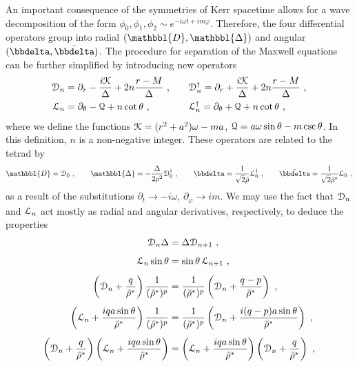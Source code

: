 An important consequence of the symmetries of Kerr spacetime allows for a wave decomposition of the form $\phi_0, \phi_1, \phi_2 \sim e^{- i \omega t + i m \varphi}$.
Therefore, the four differential operators group into radial $(\mathbbl{D}, \mathbbl{\Delta})$ and angular $(\bbdelta, \bar{\bbdelta})$. The procedure for separation of the Maxwell equations can be further simplified by introducing new operators
\begin{equation}
    \begin{alignedat}{3}
        \EuScript{D}_n &= \partial_r - \frac{i \EuScript{K}}{\Delta} + 2n \frac{r-M}{\Delta} ~,\qquad && \EuScript{D}_n^\dagger = \partial_r + \frac{i \EuScript{K}}{\Delta} + 2n \frac{r-M}{\Delta} ~,\\
        \EuScript{L}_n &= \partial_\theta - \EuScript{Q} + n \cot\theta ~,\qquad && \EuScript{L}_n^\dagger = \partial_\theta + \EuScript{Q} + n \cot\theta ~,
    \end{alignedat}
\end{equation}
where we define the functions $\EuScript{K}=(r^2+a^2)\omega - m a$, $\EuScript{Q} = a \omega \sin\theta - m \csc\theta$.
In this definition, $n$ is a non-negative integer.
These operators are related to the tetrad by
\begin{align}
    \mathbbl{D} = \EuScript{D}_0 ~,\qquad \mathbbl{\Delta} = - \frac{\Delta}{2 \rho^2 }\EuScript{D}^\dagger_0 ~,\qquad \bbdelta = \frac{1}{\sqrt{2} \bar{\rho}} \EuScript{L}^\dagger_0 ~,\qquad \bar\bbdelta = \frac{1}{\sqrt{2} \bar{\rho}^*} \EuScript{L}_0 ~,
\end{align}
as a result of the substitutions $\partial_t\rightarrow-i \omega$, $\partial_\varphi\rightarrow i m$.
We may use the fact that $\EuScript{D}_n$ and $\EuScript{L}_n$ act mostly as radial and angular derivatives, respectively, to deduce the properties
\begin{subequations}
    \begin{align}
        \label{eq3:propDeltaD}
        \EuScript{D}_n \Delta &= \Delta \EuScript{D}_{n+1} ~, \\[0.15cm]
        \label{eq3:propSinL}
        \EuScript{L}_n \sin\theta &= \sin\theta\, \EuScript{L}_{n+1} ~, \\[0.15cm]
        \label{eq3:propBarRhoD}
        \left(\EuScript{D}_n + \frac{q}{\bar{\rho}^*} \right) \frac{1}{(\bar{\rho}^*)^p} &= \frac{1}{(\bar{\rho}^*)^p} \left(\EuScript{D}_n + \frac{q-p}{\bar{\rho}^*} \right) ~, \\[0.15cm]
        \label{eq3:propBarRhoL}
        \left(\EuScript{L}_n + \frac{i q a \sin\theta}{\bar{\rho}^*} \right) \frac{1}{(\bar{\rho}^*)^p} &= \frac{1}{(\bar{\rho}^*)^p} \left(\EuScript{D}_n + \frac{i (q-p) a \sin\theta}{\bar{\rho}^*} \right) ~, \\[0.15cm]
        \label{eq3:propCommutLD}
        \left(\EuScript{D}_n + \frac{q}{\bar{\rho}^*} \right) \left(\EuScript{L}_n + \frac{i q a \sin\theta}{\bar{\rho}^*} \right) &= \left(\EuScript{L}_n + \frac{i q a \sin\theta}{\bar{\rho}^*} \right) \left(\EuScript{D}_n + \frac{q}{\bar{\rho}^*} \right) ~,
    \end{align}
\end{subequations}
